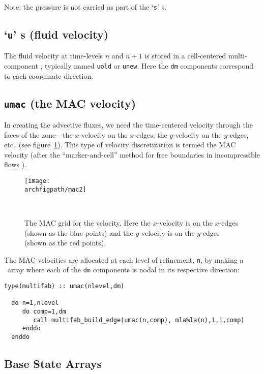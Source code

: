 Note: the pressure is not carried as part of the `{\tt s}' \multifab s.


\subsection{`{\tt u}' \multifab s (fluid velocity)}

The fluid velocity at time-levels $n$ and $n+1$ is stored in
a cell-centered multi-component \multifab, typically named
{\tt uold} or {\tt unew}.  Here the {\tt dm}
components correspond to each coordinate direction.

\subsection{{\tt umac} (the MAC velocity)}

In creating the advective fluxes, we need the time-centered velocity
through the faces of the zone---the $x$-velocity on the $x$-edges, the
$y$-velocity on the $y$-edges, etc.\ (see figure~\ref{fig:mac}).  This
type of velocity discretization is termed the MAC velocity (after the
``marker-and-cell'' method for free boundaries in incompressible
flows \cite{harlowwelch:1965}).



\begin{figure}[t]
\centering
\texttt{[image: \\archfigpath/mac2]}
\hspace{0.1in}
\begin{minipage}[b]{3.8in}
\caption[The MAC grid]
{\label{fig:mac} The MAC grid for the velocity.  
Here the $x$-velocity is on the $x$-edges (shown as the 
blue points) and the $y$-velocity is on the $y$-edges
(shown as the red points).
}\ \\
\end{minipage}
\end{figure}

The MAC velocities are allocated at each level of refinement, {\tt n},
by making a \multifab\ array where each of the {\tt dm} components is
nodal in its respective direction:
\begin{lstlisting}[language={[95]fortran},mathescape=false]
  type(multifab) :: umac(nlevel,dm)

  do n=1,nlevel
     do comp=1,dm
        call multifab_build_edge(umac(n,comp), mla%la(n),1,1,comp)
     enddo
  enddo
\end{lstlisting}



\subsection{Base State Arrays}


